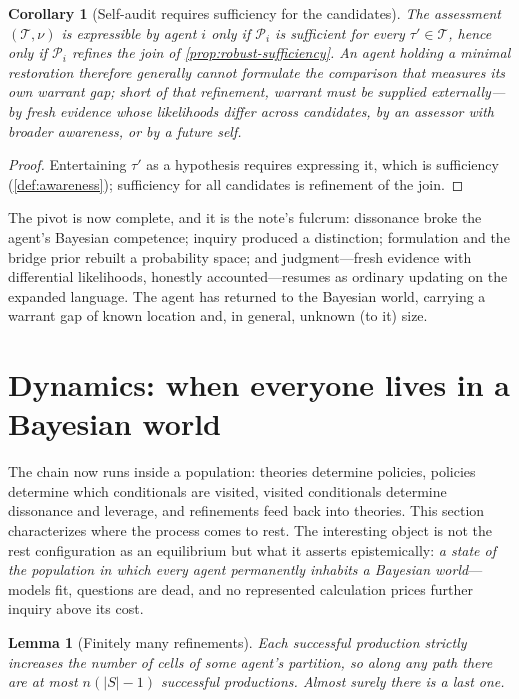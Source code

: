 \documentclass[11pt]{article}
\newtheorem{lemma}[assumption]{Lemma}
\newtheorem{corollary}[assumption]{Corollary}
\begin{document}
\begin{corollary}[Self-audit requires sufficiency for the candidates]
\label{cor:self-audit}
The assessment $(\mathcal T,\nu)$ is expressible by agent $i$ only if
$\mathcal P_i$ is sufficient for every $\tau'\in\mathcal T$, hence only if
$\mathcal P_i$ refines the join of \cref{prop:robust-sufficiency}.  An agent
holding a minimal restoration therefore generally cannot formulate the
comparison that measures its own warrant gap; short of that refinement,
warrant must be supplied externally---by fresh evidence whose likelihoods
differ across candidates, by an assessor with broader awareness, or by a
future self.
\end{corollary}

\begin{proof}
Entertaining $\tau'$ as a hypothesis requires expressing it, which is
sufficiency (\cref{def:awareness}); sufficiency for all candidates is
refinement of the join.
\end{proof}

The pivot is now complete, and it is the note's fulcrum: dissonance broke the
agent's Bayesian competence; inquiry produced a distinction; formulation and
the bridge prior rebuilt a probability space; and judgment---fresh evidence
with differential likelihoods, honestly accounted---resumes as ordinary
updating on the expanded language.  The agent has returned to the Bayesian
world, carrying a warrant gap of known location and, in general, unknown
(to it) size.

\section{Dynamics: when everyone lives in a Bayesian world}
\label{sec:dynamics}

The chain now runs inside a population: theories determine policies, policies
determine which conditionals are visited, visited conditionals determine
dissonance and leverage, and refinements feed back into theories.  This
section characterizes where the process comes to rest.  The interesting
object is not the rest configuration as an equilibrium but what it asserts
epistemically: \emph{a state of the population in which every agent
permanently inhabits a Bayesian world}---models fit, questions are dead, and
no represented calculation prices further inquiry above its cost.

\begin{lemma}[Finitely many refinements]
\label{lem:finite-refinements}
Each successful production strictly increases the number of cells of some
agent's partition, so along any path there are at most $n(|S|-1)$ successful
productions.  Almost surely there is a last one.
\end{lemma}
\end{document}
